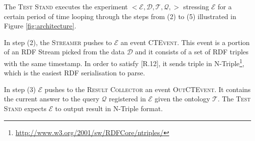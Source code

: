                                                                                                                                                                                                                                                                                                                                                                                                                                                                                                                                                                                                                                                                                                                                                                                                                                                                                                                                                                                                                                                                                                                                                                                                                                                                                                                                                                                                                                                                                                                                                                                                                                                                                                  The \textsc{Test Stand} executes the experiment $<\mathcal{E},\mathcal{D},\mathcal{T},\mathcal{Q},>$ stressing $\mathcal{E}$ for a certain period of time looping through the steps from (2) to (5) illustrated in Figure \ref{fig:architecture}. 

 In step (2), the \textsc{Streamer} pushes to $\mathcal{E}$ an event \textsc{CTEvent}. This event is a portion of an RDF Stream picked from the data $\mathcal{D}$ and it consists of a set of RDF triples with the same timestamp. In order to satisfy [R.12], it sends triple in N-Triple\footnote{\url{http://www.w3.org/2001/sw/RDFCore/ntriples/}}, which is the easiest RDF serialisation to parse.  

In step (3) $\mathcal{E}$ pushes to the \textsc{Result Collector} an event \textsc{OutCTEvent}. It contains the current answer to the query $\mathcal{Q}$ registered in $\mathcal{E}$ given the ontology $\mathcal{T}$. The \textsc{Test Stand} expects $\mathcal{E}$ to output result in N-Triple format. 

